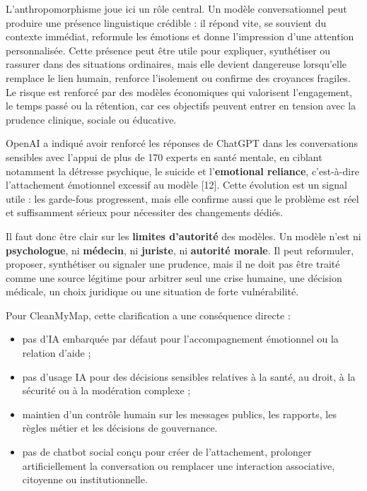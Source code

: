 \documentclass[
  10pt,
  a4paper,
  DIV=11,
  numbers=noendperiod,
  oneside]{scrreprt}
\providecommand{\tightlist}{%
  \setlength{\itemsep}{0pt}\setlength{\parskip}{0pt}}
\let\oldtextbf\textbf
\renewcommand{\textbf}[1]{\oldtextbf{\textcolor{cmmnavy}{#1}}}
\begin{document}
L'anthropomorphisme joue ici un rôle central. Un modèle conversationnel
peut produire une présence linguistique crédible : il répond vite, se
souvient du contexte immédiat, reformule les émotions et donne
l'impression d'une attention personnalisée. Cette présence peut être
utile pour expliquer, synthétiser ou rassurer dans des situations
ordinaires, mais elle devient dangereuse lorsqu'elle remplace le lien
humain, renforce l'isolement ou confirme des croyances fragiles. Le
risque est renforcé par des modèles économiques qui valorisent
l'engagement, le temps passé ou la rétention, car ces objectifs peuvent
entrer en tension avec la prudence clinique, sociale ou éducative.

OpenAI a indiqué avoir renforcé les réponses de ChatGPT dans les
conversations sensibles avec l'appui de plus de 170 experts en santé
mentale, en ciblant notamment la détresse psychique, le suicide et
l'\textbf{emotional reliance}, c'est-à-dire l'attachement émotionnel
excessif au modèle {[}12{]}. Cette évolution est un signal utile : les
garde-fous progressent, mais elle confirme aussi que le problème est
réel et suffisamment sérieux pour nécessiter des changements dédiés.

Il faut donc être clair sur les \textbf{limites d'autorité} des modèles.
Un modèle n'est ni \textbf{psychologue}, ni \textbf{médecin}, ni
\textbf{juriste}, ni \textbf{autorité morale}. Il peut reformuler,
proposer, synthétiser ou signaler une prudence, mais il ne doit pas être
traité comme une source légitime pour arbitrer seul une crise humaine,
une décision médicale, un choix juridique ou une situation de forte
vulnérabilité.

Pour CleanMyMap, cette clarification a une conséquence directe :

\begin{itemize}
\tightlist
\item
  pas d'IA embarquée par défaut pour l'accompagnement émotionnel ou la
  relation d'aide ;
\item
  pas d'usage IA pour des décisions sensibles relatives à la santé, au
  droit, à la sécurité ou à la modération complexe ;
\item
  maintien d'un contrôle humain sur les messages publics, les rapports,
  les règles métier et les décisions de gouvernance.
\item
  pas de chatbot social conçu pour créer de l'attachement, prolonger
  artificiellement la conversation ou remplacer une interaction
  associative, citoyenne ou institutionnelle.
\end{itemize}
\end{document}
